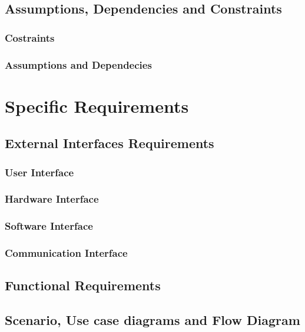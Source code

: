 \documentclass[numbers=noenddot, 12pt, a4paper, oneside]{scrbook}
\begin{document}
\section{Assumptions, Dependencies and Constraints\\}

\subsection*{Costraints}




\subsection*{Assumptions and Dependecies}


\chapter{Specific Requirements}

\section{External Interfaces Requirements}
\subsection*{User Interface}

\subsection*{Hardware Interface}



\subsection*{Software Interface}


\subsection*{Communication Interface}


\section{Functional Requirements}

\section*{Scenario, Use case diagrams and Flow Diagram}
\end{document}
